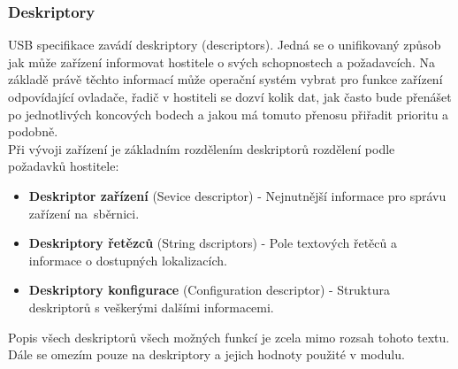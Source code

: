 \subsubsection{Deskriptory}
USB specifikace zavádí deskriptory (descriptors). Jedná se o unifikovaný způsob jak může zařízení informovat hostitele o svých schopnostech a požadavcích. Na základě právě těchto informací může operační systém vybrat pro funkce zařízení odpovídající ovladače, řadič v hostiteli se dozví kolik dat, jak často bude přenášet po jednotlivých koncových bodech a jakou má tomuto přenosu přiřadit prioritu a podobně.\\
Při vývoji zařízení je základním rozdělením deskriptorů rozdělení podle požadavků hostitele:
\begin{itemize}
\item \textbf{Deskriptor zařízení} (Sevice descriptor) - Nejnutnější informace pro správu zařízení na~sběrnici.
\item \textbf{Deskriptory řetězců} (String dscriptors) - Pole textových řetěců a informace o dostupných lokalizacích.
\item \textbf{Deskriptory konfigurace} (Configuration descriptor) - Struktura deskriptorů s veškerými dalšími informacemi.
\end{itemize}
Popis všech deskriptorů všech možných funkcí je zcela mimo rozsah tohoto textu. Dále se omezím pouze na deskriptory a jejich hodnoty použité v modulu.


